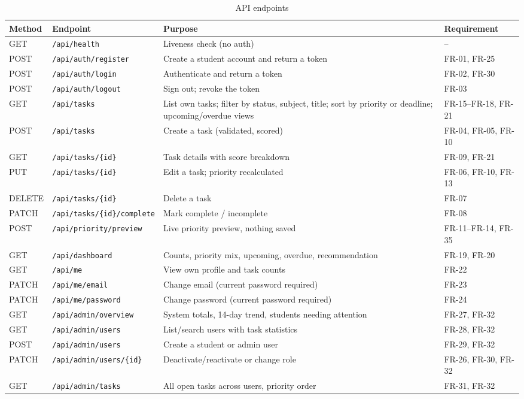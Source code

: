 \begin{table}[H]
\centering
\caption{API endpoints}
\label{tab:api}
\small
\begin{tabularx}{\textwidth}{@{}l l L l@{}}
\toprule
\textbf{Method} & \textbf{Endpoint} & \textbf{Purpose} & \textbf{Requirement} \\
\midrule
GET    & \texttt{/api/health} & Liveness check (no auth) & -- \\
POST   & \texttt{/api/auth/register} & Create a student account and return a token & FR-01, FR-25 \\
POST   & \texttt{/api/auth/login} & Authenticate and return a token & FR-02, FR-30 \\
POST   & \texttt{/api/auth/logout} & Sign out; revoke the token & FR-03 \\
GET    & \texttt{/api/tasks} & List own tasks; filter by status, subject, title; sort by priority or deadline; upcoming/overdue views & FR-15--FR-18, FR-21 \\
POST   & \texttt{/api/tasks} & Create a task (validated, scored) & FR-04, FR-05, FR-10 \\
GET    & \texttt{/api/tasks/\{id\}} & Task details with score breakdown & FR-09, FR-21 \\
PUT    & \texttt{/api/tasks/\{id\}} & Edit a task; priority recalculated & FR-06, FR-10, FR-13 \\
DELETE & \texttt{/api/tasks/\{id\}} & Delete a task & FR-07 \\
PATCH  & \texttt{/api/tasks/\{id\}/complete} & Mark complete / incomplete & FR-08 \\
POST   & \texttt{/api/priority/preview} & Live priority preview, nothing saved & FR-11--FR-14, FR-35 \\
GET    & \texttt{/api/dashboard} & Counts, priority mix, upcoming, overdue, recommendation & FR-19, FR-20 \\
GET    & \texttt{/api/me} & View own profile and task counts & FR-22 \\
PATCH  & \texttt{/api/me/email} & Change email (current password required) & FR-23 \\
PATCH  & \texttt{/api/me/password} & Change password (current password required) & FR-24 \\
GET    & \texttt{/api/admin/overview} & System totals, 14-day trend, students needing attention & FR-27, FR-32 \\
GET    & \texttt{/api/admin/users} & List/search users with task statistics & FR-28, FR-32 \\
POST   & \texttt{/api/admin/users} & Create a student or admin user & FR-29, FR-32 \\
PATCH  & \texttt{/api/admin/users/\{id\}} & Deactivate/reactivate or change role & FR-26, FR-30, FR-32 \\
GET    & \texttt{/api/admin/tasks} & All open tasks across users, priority order & FR-31, FR-32 \\
\bottomrule
\end{tabularx}
\end{table}

